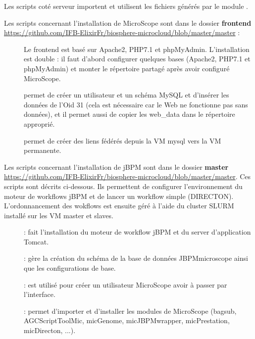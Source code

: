 Les scripts coté serveur importent et utilisent les fichiers générés par le module \micWEBdeployVer.
\bigskip

Les scripts concernant l'installation de MicroScope sont dans le dossier \textbf{frontend} \url{https://github.com/IFB-ElixirFr/biosphere-microcloud/blob/master/master} :
\begin{description}
	\item[] Le frontend est basé sur Apache2, PHP7.1 et phpMyAdmin. L'installation est double : il faut d'abord configurer quelques bases (Apache2, PHP7.1 et phpMyAdmin) et monter le répertoire partagé après avoir configuré MicroScope.
	\item[] permet de créer un utilisateur et un schéma MySQL et d'insérer les données de l'Oid 31 (cela est nécessaire car le Web ne fonctionne pas sans données), et il permet aussi de copier les web\_data dans le répertoire approprié.
	\item[] permet de créer des liens fédérés depuis la VM mysql vers la VM permanente.
\end{description}
\bigskip

Les scripts concernant l'installation de jBPM sont dans le dossier \textbf{master} \url{https://github.com/IFB-ElixirFr/biosphere-microcloud/blob/master/master}. Ces scripts sont décrits ci-dessous. Ils permettent de configurer l'environnement du moteur de workflows jBPM et de lancer un workflow simple (DIRECTON). L'ordonnancement des wokflows est ensuite géré à l'aide du cluster SLURM installé sur les VM master et slaves.

\begin{description}
	\item[] : fait l'installation du moteur de workflow jBPM et du server d'application Tomcat.
	\item[] : gère la création du schéma de la base de données JBPMmicroscope ainsi que les configurations de base.
	\item[] : est utilisé pour créer un utilisateur MicroScope avoir à passer par l'interface.
	\item[] : permet d'importer et d'installer les modules de MicroScope (bagsub, AGCScriptToolMic, micGenome, micJBPMwrapper, micPrestation, micDirecton, ...).
\end{description}
